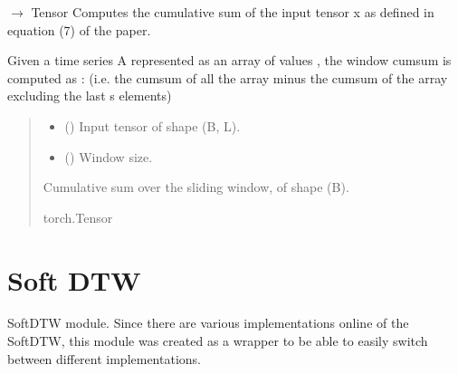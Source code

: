 \documentclass[letterpaper,10pt,english]{sphinxmanual}
\begin{document}
\begin{fulllineitems}
\label{\detokenize{dtw_loss_functions.otw:dtw_loss_functions.otw.window_cumsum}}
\pysigstartsignatures
\pysiglinewithargsret
{}
{\sphinxparamcomma {}}
{{ $\rightarrow$ Tensor}}
\pysigstopsignatures
\sphinxAtStartPar
Computes the cumulative sum of the input tensor x as defined in equation (7) of the paper.

\sphinxAtStartPar
Given a time series A represented as an array of values \sphinxcode{\sphinxupquote{{[}a1, a2, ..., aL{]}}}, the window cumsum is computed as :
(i.e. the cumsum of all the array minus the cumsum of the array excluding the last s elements)
\begin{quote}\begin{description}
\begin{itemize}
\item {} 
\sphinxAtStartPar
{} () \textendash{} Input tensor of shape (B, L).

\item {} 
\sphinxAtStartPar
{} () \textendash{} Window size.

\end{itemize}

\sphinxAtStartPar
Cumulative sum over the sliding window, of shape (B).

\sphinxAtStartPar
torch.Tensor

\end{description}\end{quote}

\end{fulllineitems}


\sphinxstepscope


\chapter{Soft DTW}
\label{\detokenize{dtw_loss_functions.soft_dtw:module-dtw_loss_functions.soft_dtw}}\label{\detokenize{dtw_loss_functions.soft_dtw:soft-dtw}}\label{\detokenize{dtw_loss_functions.soft_dtw::doc}}
\sphinxAtStartPar
SoftDTW module. Since there are various implementations online of the SoftDTW, this module was created as a wrapper to be able to easily switch between different implementations.
\end{document}
